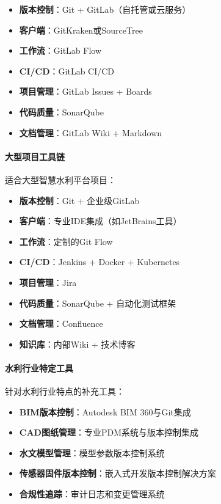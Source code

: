 \begin{itemize}
\tightlist
\item
  \textbf{版本控制}：Git + GitLab（自托管或云服务）
\item
  \textbf{客户端}：GitKraken或SourceTree
\item
  \textbf{工作流}：GitLab Flow
\item
  \textbf{CI/CD}：GitLab CI/CD
\item
  \textbf{项目管理}：GitLab Issues + Boards
\item
  \textbf{代码质量}：SonarQube
\item
  \textbf{文档管理}：GitLab Wiki + Markdown
\end{itemize}

\paragraph{大型项目工具链}\label{ux5927ux578bux9879ux76eeux5de5ux5177ux94fe}

适合大型智慧水利平台项目：

\begin{itemize}
\tightlist
\item
  \textbf{版本控制}：Git + 企业级GitLab
\item
  \textbf{客户端}：专业IDE集成（如JetBrains工具）
\item
  \textbf{工作流}：定制的Git Flow
\item
  \textbf{CI/CD}：Jenkins + Docker + Kubernetes
\item
  \textbf{项目管理}：Jira
\item
  \textbf{代码质量}：SonarQube + 自动化测试框架
\item
  \textbf{文档管理}：Confluence
\item
  \textbf{知识库}：内部Wiki + 技术博客
\end{itemize}

\paragraph{水利行业特定工具}\label{ux6c34ux5229ux884cux4e1aux7279ux5b9aux5de5ux5177}

针对水利行业特点的补充工具：

\begin{itemize}
\tightlist
\item
  \textbf{BIM版本控制}：Autodesk BIM 360与Git集成
\item
  \textbf{CAD图纸管理}：专业PDM系统与版本控制集成
\item
  \textbf{水文模型管理}：模型参数版本控制系统
\item
  \textbf{传感器固件版本控制}：嵌入式开发版本控制解决方案
\item
  \textbf{合规性追踪}：审计日志和变更管理系统
\end{itemize}


